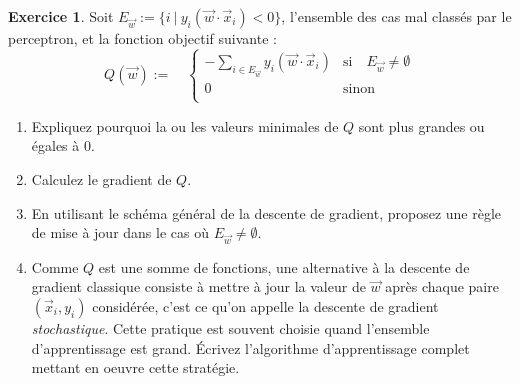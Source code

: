 \documentclass[a4paper,francais]{article}
\theoremstyle{definition}
\newtheorem{exercice}{Exercice}[section]
\newtheorem*{solution}{Solution}
\begin{document}


\begin{exercice}
  Soit $E_{\vec{w}} := \{i \ | \ y_i (\vec{w}\cdot\vec{x}_i) < 0\}$,
  l'ensemble des cas mal classés par le perceptron, 
  et la fonction objectif suivante :
  \[
  Q(\vec{w}) :=
  \quad
  \left\{
  \begin{array}{ll}
    - \sum_{i \in E_{\vec{w}}} y_i (\vec{w}\cdot\vec{x}_i) & \text{si}\quad E_{\vec{w}} \neq \emptyset \\
    0 & \text{sinon} \\
  \end{array}
  \right.
  \]

  \begin{enumerate}
  \item Expliquez pourquoi la ou les valeurs minimales de $Q$
    sont plus grandes ou égales à 0. 
  \item Calculez le gradient de $Q$.
  \item En utilisant le schéma général de la descente de gradient,
    proposez une règle de mise à jour dans le cas où $E_{\vec{w}} \neq \emptyset$. 
  \item Comme $Q$ est une somme de fonctions, une alternative à la descente de gradient classique
  consiste à mettre à jour la valeur de $\vec{w}$ après chaque paire $(\vec{x}_i, y_i)$
  considérée, c'est ce qu'on appelle la descente de gradient \emph{stochastique}.
  Cette pratique est souvent choisie quand l'ensemble d'apprentissage est grand.
  \'Ecrivez l'algorithme d'apprentissage complet mettant en oeuvre cette stratégie. 
  \end{enumerate}
\end{exercice}
\end{document}
